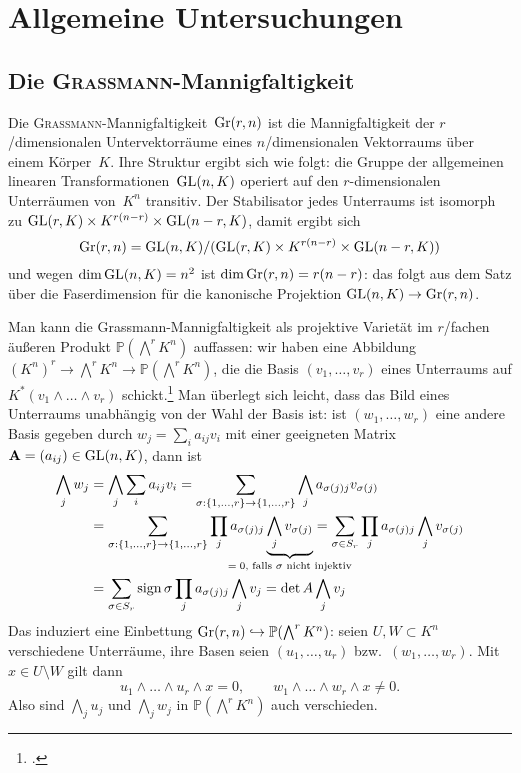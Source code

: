 \chapter{Allgemeine Untersuchungen} \label{chap:general}
\section{Die \textsc{Grassmann}-Mannigfaltigkeit} \label{sec:grassmann}
Die \textsc{Grassmann}-Mannigfaltigkeit~$\grass r/n$ ist die Mannigfaltigkeit der $r$\-/dimensionalen Untervektorräume eines $n$\-/dimensionalen Vektorraums über einem Körper~$K$. Ihre Struktur ergibt sich wie folgt: die Gruppe der allgemeinen linearen Transformationen~$\mathrm{GL}(n,K)$ operiert auf den $r$-dimensionalen Unterräumen von~$K^n$ transitiv. Der Stabilisator jedes Unterraums ist isomorph zu $\mathrm{GL}(r,K) \times K^{r(n-r)} \times \mathrm{GL}(n-r,K)$, damit ergibt sich
\begin{equation}
\grass r/n = \GL nK / (\GL rK \times K^{r(n-r)} \times \GL{n-r}K)
\end{equation}
und wegen $\dim \mathrm{GL}(n,K) = n^2$ ist $\dim \grass r/n = r(n-r)$: das folgt aus dem Satz über die Faserdimension für die kanonische Projektion $\GL nK \to \grass r/n$.

Man kann die Grassmann-Mannigfaltigkeit als projektive Varietät im $r$\-/fachen äußeren Produkt $\mathbb P(\bigwedge^r K^n)$ auffassen: wir haben eine Abbildung $(K^n)^r \to \bigwedge^r K^n \to \mathbb P(\bigwedge^r K^n)$, die die Basis $(v_1, \dots, v_r)$ eines Unterraums auf $K^*(v_1 \wedge \dots \wedge v_r)$ schickt.\footcite[siehe hierzu auch][S.~42]{Shafarevich} Man überlegt sich leicht, dass das Bild eines Unterraums unabhängig von der Wahl der Basis ist: ist $(w_1, \dots, w_r)$ eine andere Basis gegeben durch $w_j = \sum_i a_{ij} v_i$ mit einer geeigneten Matrix $\mathbf{A} = (a_{ij}) \in \mathrm{GL}(n,K)$, dann ist
\begin{align*}
\bigwedge_j w_j &= \bigwedge_j \sum_i a_{ij} v_i = \sum_{\sigma: \{1,\dots,r\} \rightarrow \{1,\dots,r\}} \bigwedge_j a_{\sigma(j)j} v_{\sigma(j)} \\
	&= \sum_{\sigma: \{1,\dots,r\} \rightarrow \{1,\dots,r\}} \prod_j a_{\sigma(j)j} \wunderbrace{\bigwedge_j v_{\sigma(j)}}_{$= 0$, falls $\sigma$ nicht injektiv} = \sum_{\sigma \in S_r} \prod_j a_{\sigma(j)j} \bigwedge_j v_{\sigma(j)} \\
	&= \sum_{\sigma \in S_r} \sign \sigma \prod_j a_{\sigma(j)j} \bigwedge_j v_j = \det A \bigwedge_j v_j
\end{align*}
Das induziert eine Einbettung $\grass r/n \into \mathbb P(\bigwedge^r K^n)$: seien $U, W \subset K^n$ verschiedene Unterräume, ihre Basen seien $(u_1, \dots, u_r)$ bzw.~$(w_1, \dots, w_r)$. Mit~$x \in U \setminus W$ gilt dann
\begin{equation*}
u_1 \wedge \dots \wedge u_r \wedge x = 0, \qquad w_1 \wedge \dots \wedge w_r \wedge x \neq 0.
\end{equation*}
Also sind $\bigwedge_j u_j$ und $\bigwedge_j w_j$ in $\mathbb P(\bigwedge^r K^n)$ auch verschieden.

